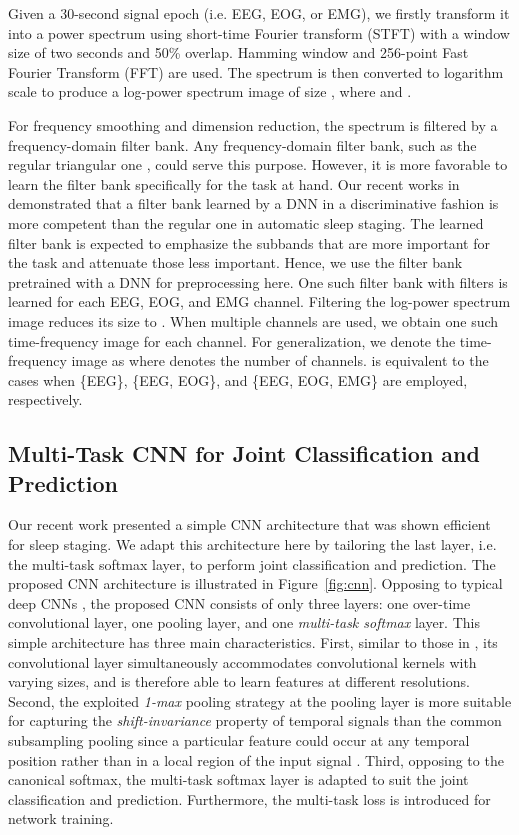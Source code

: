 \documentclass[10pt,twocolumn,twoside]{IEEEtran}
\begin{document}
Given a 30-second signal epoch (i.e. EEG, EOG, or EMG), we firstly transform it into a power spectrum using short-time Fourier transform (STFT) with a window size of two seconds and 50\% overlap. Hamming window and 256-point Fast Fourier Transform (FFT) are used. The spectrum is then converted to logarithm scale to produce a log-power spectrum image of size , where  and .

For frequency smoothing and dimension reduction, the spectrum is filtered by a frequency-domain filter bank. Any frequency-domain filter bank, such as the regular triangular one \cite{Phan2018c}, could serve this purpose. However, it is more favorable to learn the filter bank specifically for the task at hand. Our recent works in \cite{Phan2018c, Phan2018d} demonstrated that a filter bank learned by a DNN in a discriminative fashion is more competent than the regular one in automatic sleep staging. The learned filter bank is expected to emphasize the subbands that are more important for the task and attenuate those less important. Hence, we use the filter bank pretrained with a DNN for preprocessing here. 
One such filter bank with  filters is learned for each EEG, EOG, and EMG channel. Filtering the log-power spectrum image reduces its size to . When multiple channels are used, we obtain one such time-frequency image for each channel. For generalization, we denote the time-frequency image as  where  denotes the number of channels.  is equivalent to the cases when \{EEG\}, \{EEG, EOG\}, and \{EEG, EOG, EMG\} are employed, respectively.

\subsection{Multi-Task CNN for Joint Classification and Prediction}
\label{ssec:cnn}

Our recent work \cite{Phan2018c} presented a simple CNN architecture that was shown efficient for sleep staging. We adapt this architecture here by tailoring the last layer, i.e. the multi-task softmax layer, to perform joint classification and prediction. The proposed CNN architecture is illustrated in Figure~\ref{fig:cnn}. Opposing to typical deep CNNs \cite{Stephansen2017,Mikkelsen2018,Tsinalis2016,Supratak2017}, the proposed CNN consists of only three layers: one over-time convolutional layer, one pooling layer, and one \emph{multi-task softmax} layer. This simple architecture has three main characteristics. First, similar to those in \cite{Phan2017,Phan2016,Supratak2017}, its convolutional layer simultaneously accommodates convolutional kernels with varying sizes, and is therefore able to learn features at different resolutions. Second, the exploited \emph{1-max} pooling strategy at the pooling layer is more suitable for capturing the \emph{shift-invariance} property of temporal signals than the common subsampling pooling since a particular feature could occur at any temporal position rather than in a local region of the input signal \cite{Kim2014,Phan2016,Phan2017}. Third, opposing to the canonical softmax, the multi-task softmax layer is adapted to suit the joint classification and prediction. Furthermore, the multi-task loss is introduced for network training. 
\end{document}
